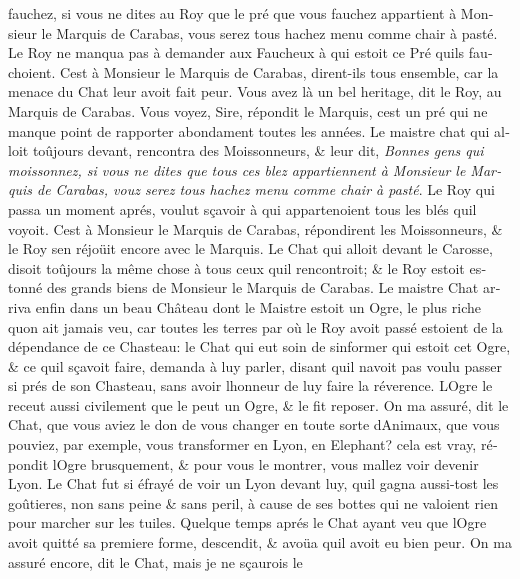\documentclass[14pt,a4paper]{memoir}
\begin{document}
\begin{otherlanguage}{french}
{fauchez, si vous ne dites au Roy que le pré que vous fauchez appartient
à Monsieur le Marquis de Carabas, vous serez tous hachez menu comme
chair à pasté}. Le Roy ne manqua pas à demander aux Faucheux à qui
estoit ce Pré qu\textquotesingle ils fauchoient. C\textquotesingle est à
Monsieur le Marquis de Carabas, dirent-ils tous ensemble, car la menace
du Chat leur avoit fait peur. Vous avez là un bel heritage, dit le Roy,
au Marquis de Carabas. Vous voyez, Sire, répondit le Marquis,
c\textquotesingle est un pré qui ne manque point de rapporter abondament
toutes les années. Le maistre chat qui alloit toûjours devant, rencontra
des Moissonneurs, \& leur dit, \emph{Bonnes gens qui moissonnez, si vous
ne dites que tous ces blez appartiennent à Monsieur le Marquis de
Carabas, vouz serez tous hachez menu comme chair à pasté}. Le Roy qui
passa un moment aprés, voulut sçavoir à qui appartenoient tous les blés
qu\textquotesingle il voyoit. C\textquotesingle est à Monsieur le
Marquis de Carabas, répondirent les Moissonneurs, \& le Roy
s\textquotesingle en réjoüit encore avec le Marquis. Le Chat qui alloit
devant le Carosse, disoit toûjours la même chose à tous ceux
qu\textquotesingle il rencontroit; \& le Roy estoit estonné des grands
biens de Monsieur le Marquis de Carabas. Le maistre Chat arriva enfin
dans un beau Château dont le Maistre estoit un Ogre, le plus riche
qu\textquotesingle on ait jamais veu, car toutes les terres par où le
Roy avoit passé estoient de la dépendance de ce Chasteau: le Chat qui
eut soin de s\textquotesingle informer qui estoit cet Ogre, \& ce
qu\textquotesingle il sçavoit faire, demanda à luy parler, disant
qu\textquotesingle il n\textquotesingle avoit pas voulu passer si prés
de son Chasteau, sans avoir l\textquotesingle honneur de luy faire la
réverence. L\textquotesingle Ogre le receut aussi civilement que le peut
un Ogre, \& le fit reposer. On m\textquotesingle a assuré, dit le Chat,
que vous aviez le don de vous changer en toute sorte
d\textquotesingle Animaux, que vous pouviez, par exemple, vous
transformer en Lyon, en Elephant? cela est vray, répondit
l\textquotesingle Ogre brusquement, \& pour vous le montrer, vous
m\textquotesingle allez voir devenir Lyon. Le Chat fut si éfrayé de voir
un Lyon devant luy, qu\textquotesingle il gagna aussi-tost les
goûtieres, non sans peine \& sans peril, à cause de ses bottes qui ne
valoient rien pour marcher sur les tuiles. Quelque temps aprés le Chat
ayant veu que l\textquotesingle Ogre avoit quitté sa premiere forme,
descendit, \& avoüa qu\textquotesingle il avoit eu bien peur. On
m\textquotesingle a assuré encore, dit le Chat, mais je ne sçaurois le

\end{otherlanguage}
\end{document}
